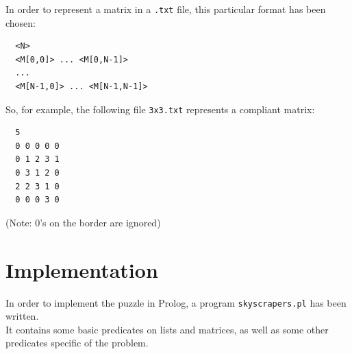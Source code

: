 \documentclass{article}
\begin{document}
In order to represent a matrix in a \texttt{.txt} file, this particular format has been chosen:\\

\begin{verbatim}
  <N>
  <M[0,0]> ... <M[0,N-1]>
  ...
  <M[N-1,0]> ... <M[N-1,N-1]>
\end{verbatim}

So, for example, the following file \texttt{3x3.txt} represents a compliant matrix:\\

\begin{verbatim}
  5
  0 0 0 0 0
  0 1 2 3 1
  0 3 1 2 0
  2 2 3 1 0
  0 0 0 3 0
\end{verbatim}

(Note: 0's on the border are ignored)\\

\pagebreak

\section{Implementation}
In order to implement the puzzle in Prolog, a program \texttt{skyscrapers.pl} has been written.\\
It contains some basic predicates on lists and matrices, as well as some other predicates specific of the problem.\\
\end{document}
